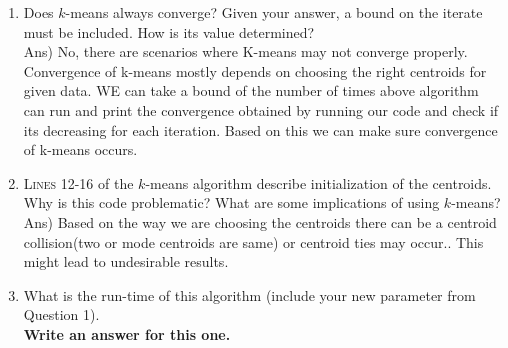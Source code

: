 \documentclass{article}
\begin{document}
\begin{enumerate}
\item Does $k$-means always converge? Given your answer, a bound on the iterate must be included.  How is its value determined? \\
Ans) No, there are scenarios where K-means may not converge properly. Convergence of k-means mostly depends on choosing the right centroids for given data. WE can take a bound of the number of times above algorithm can run and print the convergence obtained by running our code and check if its decreasing for each iteration. Based on this we can make sure convergence of k-means occurs.
\item \textsc{Lines} 12-16 of the $k$-means algorithm describe initialization of the centroids.  Why is this code problematic?  What are some implications of using $k$-means?    \\ 
Ans) Based on the way we are choosing the centroids there can be a centroid collision(two or mode centroids are same) or centroid ties may occur.. This might lead to undesirable results.
\item What is the run-time of this algorithm (include your new parameter from Question 1). \\
  \textbf{ Write an answer for this one.} 
  

\end{enumerate}
\end{document}
